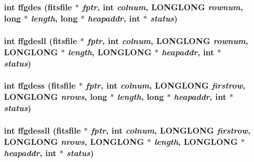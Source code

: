 \subsubsection{\setlength{\rightskip}{0pt plus 5cm}int ffgdes (\bf{fitsfile} $\ast$ {\em fptr}, int {\em colnum}, \bf{LONGLONG} {\em rownum}, long $\ast$ {\em length}, long $\ast$ {\em heapaddr}, int $\ast$ {\em status})}\label{test_2roimasker_2fitsio_8h_c66d84a807557a2d7aa8f1a3b3012100}


\subsubsection{\setlength{\rightskip}{0pt plus 5cm}int ffgdesll (\bf{fitsfile} $\ast$ {\em fptr}, int {\em colnum}, \bf{LONGLONG} {\em rownum}, \bf{LONGLONG} $\ast$ {\em length}, \bf{LONGLONG} $\ast$ {\em heapaddr}, int $\ast$ {\em status})}\label{test_2roimasker_2fitsio_8h_3d39c62a134b069e27cc44a8a51f8536}


\subsubsection{\setlength{\rightskip}{0pt plus 5cm}int ffgdess (\bf{fitsfile} $\ast$ {\em fptr}, int {\em colnum}, \bf{LONGLONG} {\em firstrow}, \bf{LONGLONG} {\em nrows}, long $\ast$ {\em length}, long $\ast$ {\em heapaddr}, int $\ast$ {\em status})}\label{test_2roimasker_2fitsio_8h_7d0b7c25bc1bd32b8f115343aa4abb93}


\subsubsection{\setlength{\rightskip}{0pt plus 5cm}int ffgdessll (\bf{fitsfile} $\ast$ {\em fptr}, int {\em colnum}, \bf{LONGLONG} {\em firstrow}, \bf{LONGLONG} {\em nrows}, \bf{LONGLONG} $\ast$ {\em length}, \bf{LONGLONG} $\ast$ {\em heapaddr}, int $\ast$ {\em status})}\label{test_2roimasker_2fitsio_8h_9d2a8b64f329ddcc261edfacabb4861f}


